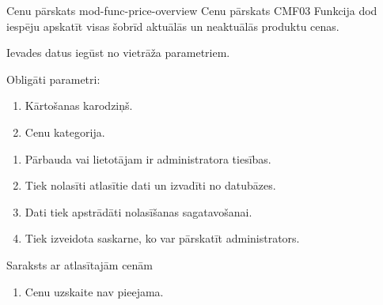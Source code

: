 \moduleFunctionTable
{Cenu pārskats}
{mod-func-price-overview}
{Cenu pārskats}
{CMF03}
{
	Funkcija dod iespēju apskatīt visas šobrīd aktuālās un neaktuālās produktu cenas.
}
{
	Ievades datus iegūst no vietrāža parametriem.

	Obligāti parametri:
	\begin{enumerate}
		\item Kārtošanas karodziņš.
		\item Cenu kategorija.
	\end{enumerate}
}
{
	\begin{enumerate}
		\item Pārbauda vai lietotājam ir administratora tiesības.
		\item Tiek nolasīti atlasītie dati un izvadīti no datubāzes.
		\item Dati tiek apstrādāti nolasīšanas sagatavošanai.
		\item Tiek izveidota saskarne, ko var pārskatīt administrators.
	\end{enumerate}
}
{
	Saraksts ar atlasītajām cenām
}
{
	\begin{enumerate}
		\item Cenu uzskaite nav pieejama.
	\end{enumerate}
}
